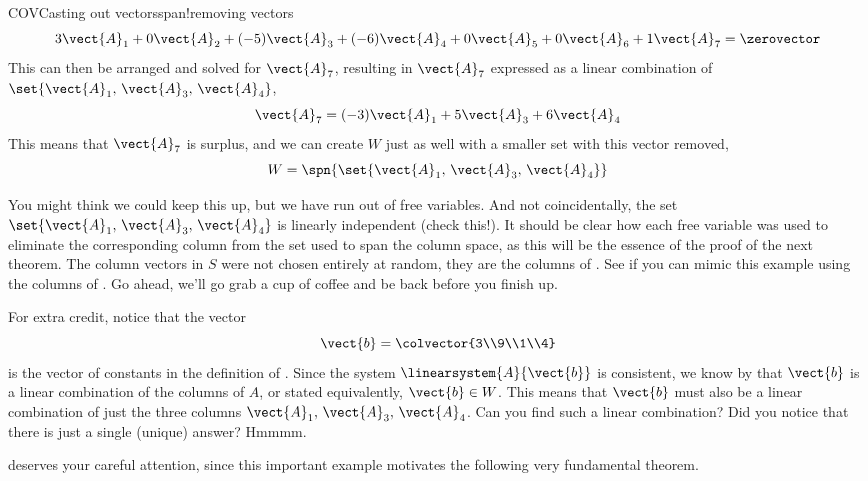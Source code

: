 \begin{example}{COV}{Casting out vectors}{span!removing vectors}
%
\begin{equation*}
3\vect{A}_1+
0\vect{A}_2+
(-5)\vect{A}_3+
(-6)\vect{A}_4+
0\vect{A}_5+
0\vect{A}_6+
1\vect{A}_7
=\zerovector
\end{equation*}
%
This can then be arranged and solved for $\vect{A}_7$, resulting in $\vect{A}_7$ expressed as a linear combination of $\set{\vect{A}_1,\,\vect{A}_3,\,\vect{A}_4}$,
%
\begin{equation*}
\vect{A}_7=
(-3)\vect{A}_1+
5\vect{A}_3+
6\vect{A}_4
\end{equation*}
%
This means that $\vect{A}_7$ is surplus, and we can create $W$ just as well with a smaller set with  this vector removed,
%
\begin{equation*}
W=\spn{\set{\vect{A}_1,\,\vect{A}_3,\,\vect{A}_4}}
\end{equation*}
%
\par
%
You might think we could keep this up, but we have run out of free variables.  And not coincidentally, the set $\set{\vect{A}_1,\,\vect{A}_3,\,\vect{A}_4}$ is linearly independent (check this!).  It should be clear how each free variable was used to eliminate the corresponding column from the set used to span the column space, as this will be the essence of the proof of the next theorem.  The column vectors in $S$ were not chosen entirely at random, they are the columns of .  See if you can mimic this example using the columns of .  Go ahead, we'll go grab a cup of coffee and be back before you finish up.\par
%
For extra credit, notice that the vector
%
\begin{equation*}
\vect{b}=\colvector{3\\9\\1\\4}
\end{equation*}
%
is the vector of constants in the definition of .  Since the system $\linearsystem{A}{\vect{b}}$ is consistent, we know by  that $\vect{b}$ is a linear combination of the columns of $A$, or stated equivalently, $\vect{b}\in W$.  This means that $\vect{b}$ must also be a linear combination of just the three columns $\vect{A}_1,\,\vect{A}_3,\,\vect{A}_4$.  Can you find such a linear combination?  Did you notice that there is just a single (unique) answer?  Hmmmm.
%
\end{example}
%
 deserves your careful attention, since this important example motivates the following very fundamental theorem.
